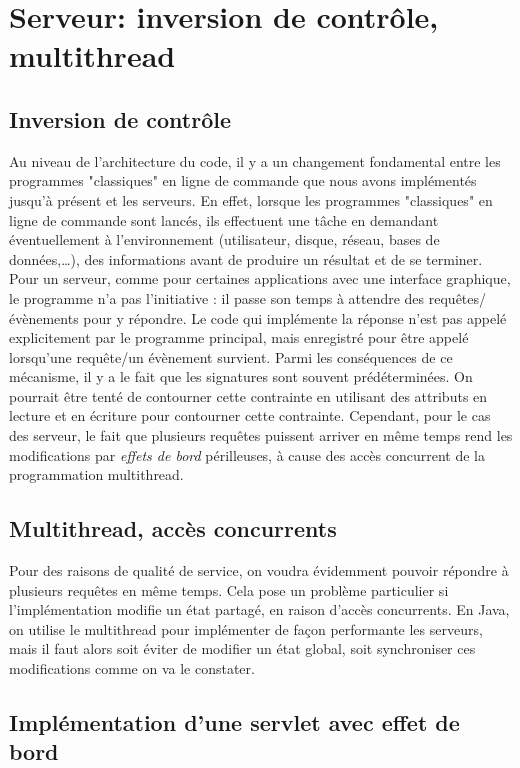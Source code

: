 \documentclass[11pt]{article}
\begin{document}
\section{Serveur: inversion de contrôle, multithread}
\label{sec:org2048dfc}

\subsection{Inversion de contrôle}
\label{sec:org990e2c4}
Au niveau de l'architecture du code, il y a un changement fondamental entre les
programmes "classiques" en ligne de commande que nous avons implémentés jusqu'à
présent et les serveurs. En effet, lorsque les programmes "classiques" en ligne de
commande sont lancés, ils effectuent une tâche en demandant éventuellement à
l'environnement (utilisateur, disque, réseau, bases de données,…), des
informations avant de produire un résultat et de se terminer. Pour un serveur,
comme pour certaines applications avec une interface graphique, le programme n'a
pas l'initiative : il passe son temps à attendre des requêtes/évènements pour y
répondre. Le code qui implémente la réponse n'est pas appelé explicitement par
le programme principal, mais enregistré pour être appelé lorsqu'une requête/un
évènement survient. Parmi les conséquences de ce mécanisme, il y a le fait que les signatures
sont souvent prédéterminées. On pourrait être tenté de contourner cette
contrainte en utilisant des attributs en lecture et en écriture pour contourner
cette contrainte. Cependant, pour le cas des serveur, le fait que plusieurs
requêtes puissent arriver en même temps rend les modifications par \emph{effets de
bord} périlleuses, à cause des accès concurrent de la programmation multithread.


\subsection{Multithread, accès concurrents}
\label{sec:orgba098ff}

Pour des raisons de qualité de service, on voudra évidemment pouvoir répondre à
plusieurs requêtes en même temps. Cela pose un problème particulier si
l'implémentation modifie un état partagé, en raison d'accès concurrents. En
Java, on utilise le multithread pour implémenter de façon performante les
serveurs, mais il faut alors soit éviter de modifier un état global, soit
synchroniser ces modifications comme on va le constater.

\subsection{Implémentation d'une servlet avec effet de bord}
\label{sec:org84d311b}
\end{document}
